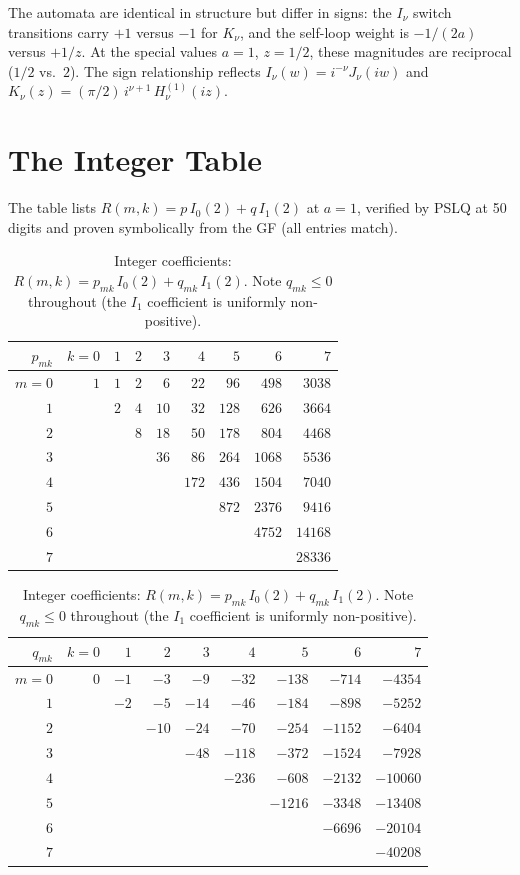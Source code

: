 \documentclass[11pt,a4paper]{article}
\begin{document}
The automata are identical in structure but differ in signs: the $I_\nu$
switch transitions carry $+1$ versus $-1$ for $K_\nu$, and the
self-loop weight is $-1/(2a)$ versus $+1/z$. At the special values
$a=1$, $z=1/2$, these magnitudes are reciprocal ($1/2$ vs.\ $2$).
The sign relationship reflects $I_\nu(w) = i^{-\nu} J_\nu(iw)$
and $K_\nu(z) = (\pi/2)\, i^{\nu+1}\, H_\nu^{(1)}(iz)$.

\section{The Integer Table}

The table lists $R(m,k) = p\, I_0(2) + q\, I_1(2)$ at $a = 1$,
verified by PSLQ at 50 digits and proven symbolically from the GF
(all entries match).

\begin{table}[ht]
\centering
\small
\begin{tabular}{r|rrrrrrrr}
$p_{mk}$ & $k=0$ & $1$ & $2$ & $3$ & $4$ & $5$ & $6$ & $7$ \\
\hline
$m=0$ & $1$ & $1$ & $2$ & $6$ & $22$ & $96$ & $498$ & $3038$ \\
$1$ &  & $2$ & $4$ & $10$ & $32$ & $128$ & $626$ & $3664$ \\
$2$ &  &  & $8$ & $18$ & $50$ & $178$ & $804$ & $4468$ \\
$3$ &  &  &  & $36$ & $86$ & $264$ & $1068$ & $5536$ \\
$4$ &  &  &  &  & $172$ & $436$ & $1504$ & $7040$ \\
$5$ &  &  &  &  &  & $872$ & $2376$ & $9416$ \\
$6$ &  &  &  &  &  &  & $4752$ & $14168$ \\
$7$ &  &  &  &  &  &  &  & $28336$ \\
\end{tabular}

\bigskip

\begin{tabular}{r|rrrrrrrr}
$q_{mk}$ & $k=0$ & $1$ & $2$ & $3$ & $4$ & $5$ & $6$ & $7$ \\
\hline
$m=0$ & $0$ & $-1$ & $-3$ & $-9$ & $-32$ & $-138$ & $-714$ & $-4354$ \\
$1$ &  & $-2$ & $-5$ & $-14$ & $-46$ & $-184$ & $-898$ & $-5252$ \\
$2$ &  &  & $-10$ & $-24$ & $-70$ & $-254$ & $-1152$ & $-6404$ \\
$3$ &  &  &  & $-48$ & $-118$ & $-372$ & $-1524$ & $-7928$ \\
$4$ &  &  &  &  & $-236$ & $-608$ & $-2132$ & $-10060$ \\
$5$ &  &  &  &  &  & $-1216$ & $-3348$ & $-13408$ \\
$6$ &  &  &  &  &  &  & $-6696$ & $-20104$ \\
$7$ &  &  &  &  &  &  &  & $-40208$ \\
\end{tabular}
\caption{Integer coefficients: $R(m,k) = p_{mk}\, I_0(2) + q_{mk}\, I_1(2)$.
Note $q_{mk} \le 0$ throughout (the $I_1$ coefficient is uniformly
non-positive).}
\end{table}
\end{document}
